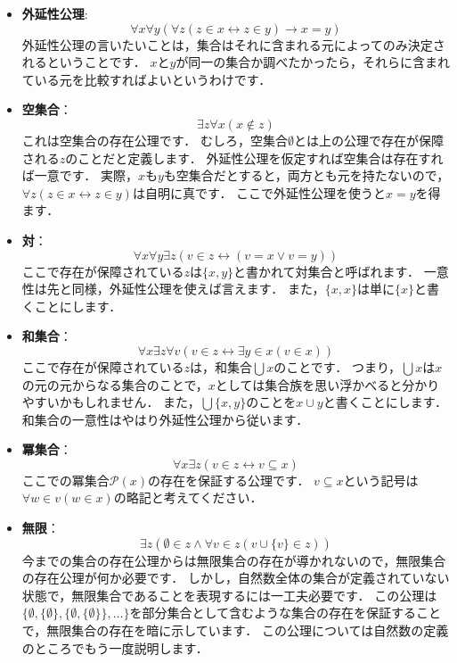 \documentclass[./main]{subfiles}
\newcommand{\tbf}{\textbf}
\newcommand{\mcl}{\mathcal}
\renewcommand{\subset}{\subseteq}
\begin{document}
\begin{itemize}
\item
\tbf{外延性公理}:
\[
\forall x\forall y(\forall z(z\in x\leftrightarrow z\in y)\to x=y)
\]
外延性公理の言いたいことは，集合はそれに含まれる元によってのみ決定されるということです．
$x$と$y$が同一の集合か調べたかったら，それらに含まれている元を比較すればよいというわけです．

\item
\tbf{空集合}：
\[
\exists z\forall x(x\notin z)
\]
これは空集合の存在公理です．
むしろ，空集合$\emptyset$とは上の公理で存在が保障される$z$のことだと定義します．
外延性公理を仮定すれば空集合は存在すれば一意です．
実際，$x$も$y$も空集合だとすると，両方とも元を持たないので，$\forall z(z\in x\leftrightarrow z\in y)$は自明に真です．
ここで外延性公理を使うと$x=y$を得ます．

\item
\tbf{対}：
\[
\forall x\forall y\exists z(v\in z\leftrightarrow(v=x\vee v=y))
\]
ここで存在が保障されている$z$は$\{x, y\}$と書かれて対集合と呼ばれます．
一意性は先と同様，外延性公理を使えば言えます．
また，$\{x, x\}$は単に$\{x\}$と書くことにします．

\item
\tbf{和集合}：
\[
\forall x\exists z\forall v(v\in z\leftrightarrow\exists y\in x(v\in x))
\]
ここで存在が保障されている$z$は，和集合$\bigcup x$のことです．
つまり，$\bigcup x$は$x$の元の元からなる集合のことで，$x$としては集合族を思い浮かべると分かりやすいかもしれません．
また，$\bigcup\{x,y\}$のことを$x\cup y$と書くことにします．
和集合の一意性はやはり外延性公理から従います．

\item
\tbf{冪集合}：
\[
\forall x\exists z(v\in z\leftrightarrow v\subset x)
\]
ここでの冪集合$\mcl{P}(x)$の存在を保証する公理です．
$v\subset x$という記号は$\forall w\in v(w\in x)$の略記と考えてください．

\item
\tbf{無限}：
\[
\exists z(\emptyset\in z\wedge\forall v\in z(v\cup\{v\}\in z))
\]
今までの集合の存在公理からは無限集合の存在が導かれないので，無限集合の存在公理が何か必要です．
しかし，自然数全体の集合が定義されていない状態で，無限集合であることを表現するには一工夫必要です．
この公理は$\{\emptyset,\{\emptyset\},\{\emptyset,\{\emptyset\}\},\ldots\}$を部分集合として含むような集合の存在を保証することで，無限集合の存在を暗に示しています．
この公理については自然数の定義のところでもう一度説明します．


\end{itemize}
\end{document}
